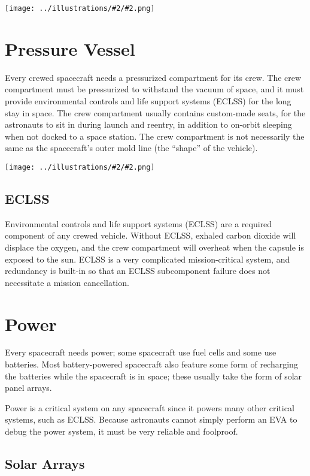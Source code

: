 \documentclass[oneside,a5paper]{book}
\newcommand{\widthillustration}[2]{{\centering\texttt{[image: ../illustrations/\#2/\#2.png]}}}
\newcommand{\illustration}[1]{\widthillustration{\linewidth}{#1}}
\begin{document}
\illustration{service-module}

\section{Pressure Vessel}

Every crewed spacecraft needs a pressurized compartment for its
crew. The crew compartment must be pressurized to withstand the vacuum
of space, and it must provide environmental controls and life support
systems (ECLSS) for the long stay in space. The crew compartment
usually contains custom-made seats, for the astronauts to sit in
during launch and reentry, in addition to on-orbit sleeping when not
docked to a space station. The crew compartment is not necessarily the
same as the spacecraft’s outer mold line (the ``shape'' of the vehicle).

\illustration{pressure-vessel}

\subsection{ECLSS}

Environmental controls and life support systems (ECLSS) are a required
component of any crewed vehicle. Without ECLSS, exhaled carbon dioxide
will displace the oxygen, and the crew compartment will overheat when
the capsule is exposed to the sun. ECLSS is a very complicated
mission-critical system, and redundancy is built-in so that an ECLSS
subcomponent failure does not necessitate a mission cancellation.

\section{Power}

Every spacecraft needs power; some spacecraft use fuel cells and some
use batteries. Most battery-powered spacecraft also feature some form
of recharging the batteries while the spacecraft is in space; these
usually take the form of solar panel arrays.

Power is a critical system on any spacecraft since it powers many
other critical systems, such as ECLSS. Because astronauts cannot
simply perform an EVA to debug the power system, it must be very
reliable and foolproof.

\subsection{Solar Arrays}
\end{document}
